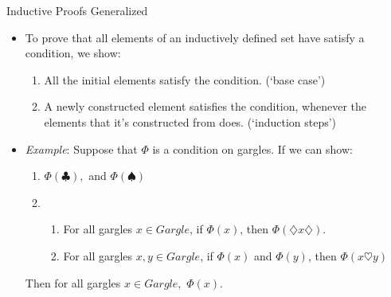 \begin{frame}{Inductive Proofs Generalized}

	\begin{itemize}
	
		\item To prove that all elements of an inductively defined set have satisfy a condition, we show:
		
		\begin{enumerate}[1.]
			
			\item All the initial elements satisfy the condition. (`base case')
			
			\item A newly constructed element satisfies the condition, whenever the elements that it's constructed from does. (`induction steps')
		
		\end{enumerate}
		
		\item \emph{Example}: Suppose that $\Phi$ is a condition on gargles. If we can show:
			\begin{enumerate}
			
				\item $\Phi(\clubsuit),$ and $\Phi(\spadesuit)$
				
				\item \begin{enumerate}\item For all gargles $x\in Gargle$, if $\Phi(x)$, then $\Phi(\diamondsuit x\diamondsuit)$.
			
					\item  For all gargles $x,y\in Gargle$, if $\Phi(x)$ and $\Phi(y)$, then $\Phi(x\heartsuit y)$
					
					\end{enumerate}
			\end{enumerate}
			Then for all gargles $x\in Gargle,$ $\Phi(x)$.
	
	\end{itemize}

\end{frame}

